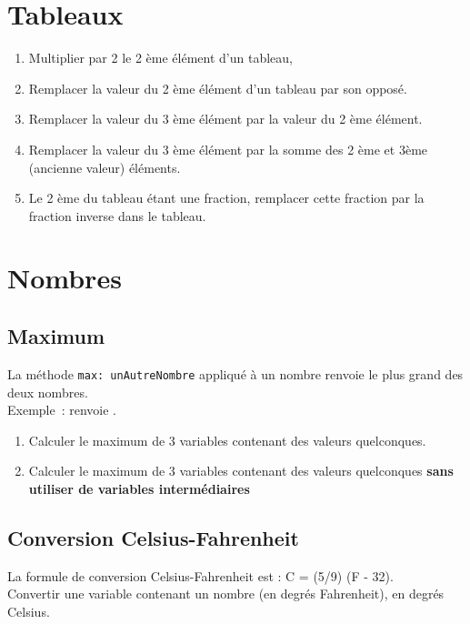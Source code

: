 \section{Tableaux}

\begin{enumerate}

\item Multiplier  par 2 le 2 \`eme \'el\'ement d'un tableau,
\item Remplacer la valeur du 2 \`eme \'el\'ement d'un tableau par son oppos\'e.
\item  Remplacer la valeur du 3 \`eme  \'el\'ement par la valeur du 2 \`eme
\'el\'ement.
\item  Remplacer la valeur du 3 \`eme  \'el\'ement par la somme des 2 \`eme
et 3\`eme (ancienne valeur) \'el\'ements.
\item Le 2 \`eme du tableau \'etant une fraction, remplacer cette fraction par la fraction inverse dans le tableau.
\end{enumerate}

\section{Nombres}

\subsection{Maximum}

La m\'ethode \verb|max: unAutreNombre| appliqu\'e \`a un nombre
renvoie le plus grand des deux nombres.\\
Exemple~:  renvoie .

\begin{enumerate}
\item Calculer le maximum de 3 variables  contenant des valeurs
quelconques.
\item Calculer le maximum de 3 variables  contenant des valeurs
quelconques {\bf sans utiliser de variables interm\'ediaires}
\end{enumerate}

\subsection{Conversion Celsius-Fahrenheit}

La formule de conversion Celsius-Fahrenheit est :
C = (5/9) (F - 32).\\
Convertir une variable contenant un nombre (en degr\'es Fahrenheit),
en degr\'es Celsius.


\ifx\wholebook\relax\else\fi








